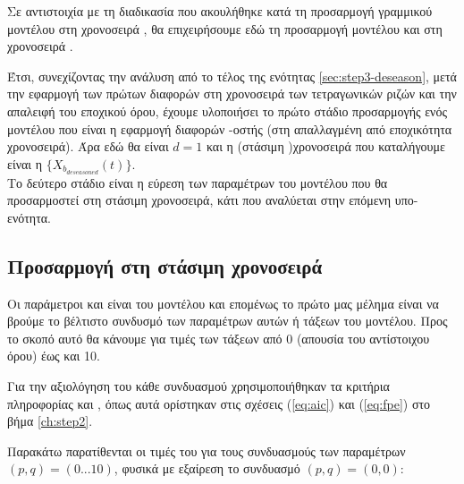 Σε αντιστοιχία με τη διαδικασία που ακουλήθηκε κατά τη προσαρμογή γραμμικού μοντέλου στη χρονοσειρά , θα επιχειρήσουμε εδώ τη προσαρμογή μοντέλου  και στη χρονοσειρά .

Έτσι, συνεχίζοντας την ανάλυση από το τέλος της ενότητας \ref{sec:step3-deseason}, μετά την εφαρμογή των πρώτων διαφορών στη χρονοσειρά των τετραγωνικών ριζών και την απαλειφή του εποχικού όρου, έχουμε υλοποιήσει το πρώτο στάδιο προσαρμογής ενός μοντέλου  που είναι η εφαρμογή διαφορών -οστής (στη απαλλαγμένη από εποχικότητα χρονοσειρά). Άρα εδώ θα είναι $d=1$ και η (στάσιμη )χρονοσειρά που καταλήγουμε είναι η $\{X_{b_{deseasoned}}(t)\}$.\\
Το δεύτερο στάδιο είναι η εύρεση των παραμέτρων του μοντέλου  που θα προσαρμοστεί στη στάσιμη χρονοσειρά, κάτι που αναλύεται στην επόμενη υπο-ενότητα. 

\subsection{Προσαρμογή  στη στάσιμη χρονοσειρά}

Οι παράμετροι  και  είναι  του μοντέλου και επομένως το πρώτο μας μέλημα είναι να βρούμε το βέλτιστο συνδυσμό των παραμέτρων αυτών ή τάξεων του μοντέλου. Προς το σκοπό αυτό θα κάνουμε  για τιμές των τάξεων από 0 (απουσία του αντίστοιχου όρου) έως και 10.\par

Για την αξιολόγηση του κάθε συνδυασμού χρησιμοποιήθηκαν τα κριτήρια πληροφορίας  και , όπως αυτά ορίστηκαν στις σχέσεις (\ref{eq:aic}) και (\ref{eq:fpe}) στο βήμα \ref{ch:step2}.

\par Παρακάτω παρατίθενται οι τιμές του  για τους συνδυασμούς των παραμέτρων $(p,q)=(0...10)$, φυσικά με εξαίρεση το συνδυασμό $(p,q)=(0,0)$:

